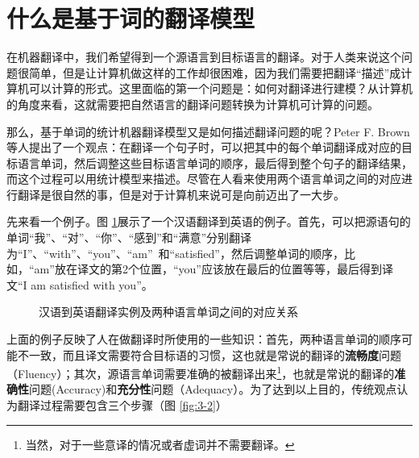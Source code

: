 
\section{什么是基于词的翻译模型}

\parinterval 在机器翻译中，我们希望得到一个源语言到目标语言的翻译。对于人类来说这个问题很简单，但是让计算机做这样的工作却很困难，因为我们需要把翻译``描述''成计算机可以计算的形式。这里面临的第一个问题是：如何对翻译进行建模？从计算机的角度来看，这就需要把自然语言的翻译问题转换为计算机可计算的问题。

\parinterval 那么，基于单词的统计机器翻译模型又是如何描述翻译问题的呢？Peter F. Brown等人提出了一个观点\cite{Peter1993The}：在翻译一个句子时，可以把其中的每个单词翻译成对应的目标语言单词，然后调整这些目标语言单词的顺序，最后得到整个句子的翻译结果，而这个过程可以用统计模型来描述。尽管在人看来使用两个语言单词之间的对应进行翻译是很自然的事，但是对于计算机来说可是向前迈出了一大步。

\parinterval 先来看一个例子。图 \ref{fig:3-1}展示了一个汉语翻译到英语的例子。首先，可以把源语句的单词``我''、``对''、``你''、``感到''和``满意''分别翻译为``I''、``with''、``you''、``am''\ 和``satisfied''，然后调整单词的顺序，比如，``am''放在译文的第2个位置，``you''应该放在最后的位置等等，最后得到译文``I am satisfied with you''。

\begin{figure}[htp]
    \centering

    \caption{汉语到英语翻译实例及两种语言单词之间的对应关系}
    \label{fig:3-1}
\end{figure}

\parinterval 上面的例子反映了人在做翻译时所使用的一些知识：首先，两种语言单词的顺序可能不一致，而且译文需要符合目标语的习惯，这也就是常说的翻译的{\small\sffamily\bfseries{流畅度}}问题（Fluency）；其次，源语言单词需要准确的被翻译出来\footnote{当然，对于一些意译的情况或者虚词并不需要翻译。}，也就是常说的翻译的{\small\sffamily\bfseries{准确性}}问题(Accuracy)和{\small\sffamily\bfseries{充分性}}问题（Adequacy）。为了达到以上目的，传统观点认为翻译过程需要包含三个步骤（图 \ref{fig:3-2}）

